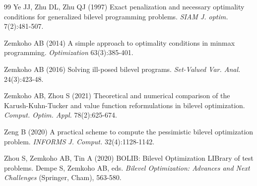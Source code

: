\begin{thebibliography}{99}
  Ye JJ, Zhu DL,  Zhu QJ (1997) Exact penalization and necessary optimality conditions for generalized bilevel programming problems. \emph{SIAM J. optim.} 7(2):481-507.

 Zemkoho AB (2014) A simple approach to optimality conditions in
	minmax programming. \emph{Optimization} 63(3):385-401.
	
 Zemkoho  AB (2016) Solving ill-posed bilevel programs. \emph{Set-Valued Var. Anal.}  24(3):423-48.
	
 Zemkoho AB, Zhou S (2021)  Theoretical and numerical comparison of the Karush-Kuhn-Tucker and
	value function reformulations in bilevel optimization. \emph{Comput. Optim. Appl.}  78(2):625-674.
	
	 Zeng B (2020) A practical scheme to compute the pessimistic bilevel optimization problem. \emph{INFORMS J. Comput.} 32(4):1128-1142.
	
 Zhou S, Zemkoho  AB, Tin A  (2020)  BOLIB:
	Bilevel Optimization LIBrary of test problems. Dempe S, Zemkoho AB, eds. \emph{Bilevel Optimization: Advances and Next Challenges}
(Springer, Cham),  563-580. %
\end{thebibliography}


\appendix

